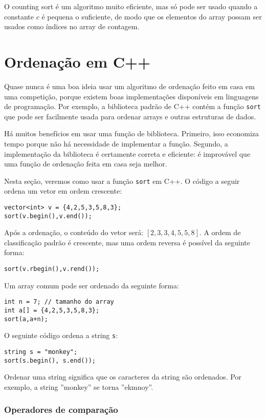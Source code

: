 O counting sort é um algoritmo muito eficiente, mas só pode ser usado quando a constante $c$
é pequena o suficiente, de modo que os elementos do array
possam ser usados como índices no array de contagem.

\section{Ordenação em C++}


Quase nunca é uma boa ideia usar um algoritmo de ordenação feito em casa em uma competição, porque existem boas implementações disponíveis em linguagens de programação.
Por exemplo, a biblioteca padrão de C++ contém a função \texttt{sort} que pode ser facilmente usada para ordenar arrays e outras estruturas de dados.

Há muitos benefícios em usar uma função de biblioteca. Primeiro, isso economiza tempo porque não há necessidade de implementar a função. Segundo, a implementação da biblioteca é certamente correta e eficiente: é improvável que uma função de ordenação feita em casa seja melhor.

Nesta seção, veremos como usar a função \texttt{sort} em C++.
O código a seguir ordena um vetor em ordem crescente:
\begin{lstlisting}
vector<int> v = {4,2,5,3,5,8,3};
sort(v.begin(),v.end());
\end{lstlisting}
Após a ordenação, o conteúdo do vetor será:
$[2,3,3,4,5,5,8]$.
A ordem de classificação padrão é crescente, mas uma ordem reversa é possível da seguinte forma:
\begin{lstlisting}
sort(v.rbegin(),v.rend());
\end{lstlisting}
Um array comum pode ser ordenado da seguinte forma:
\begin{lstlisting}
int n = 7; // tamanho do array
int a[] = {4,2,5,3,5,8,3};
sort(a,a+n);
\end{lstlisting}
\newpage
O seguinte código ordena a string \texttt{s}:
\begin{lstlisting}
string s = "monkey";
sort(s.begin(), s.end());
\end{lstlisting}
Ordenar uma string significa que os caracteres da string são ordenados.
Por exemplo, a string ''monkey'' se torna ''ekmnoy''.

\subsubsection{Operadores de comparação}

